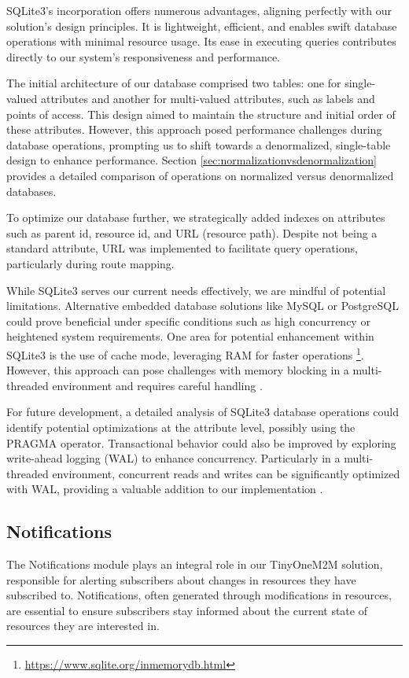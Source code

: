 \documentclass[a4paper,fleqn]{cas-dc}
\begin{document}
SQLite3's incorporation offers numerous advantages, aligning perfectly with our solution's design principles. It is lightweight, efficient, and enables swift database operations with minimal resource usage. Its ease in executing queries contributes directly to our system's responsiveness and performance.

The initial architecture of our database comprised two tables: one for single-valued attributes and another for multi-valued attributes, such as labels and points of access. This design aimed to maintain the structure and initial order of these attributes. However, this approach posed performance challenges during database operations, prompting us to shift towards a denormalized, single-table design to enhance performance. Section \ref{sec:normalizationvsdenormalization} provides a detailed comparison of operations on normalized versus denormalized databases.

To optimize our database further, we strategically added indexes on attributes such as parent id, resource id, and URL (resource path). Despite not being a standard attribute, URL was implemented to facilitate query operations, particularly during route mapping.

While SQLite3 serves our current needs effectively, we are mindful of potential limitations. Alternative embedded database solutions like MySQL or PostgreSQL could prove beneficial under specific conditions such as high concurrency or heightened system requirements. One area for potential enhancement within SQLite3 is the use of cache mode, leveraging RAM for faster operations \footnote{\url{https://www.sqlite.org/inmemorydb.html}}. However, this approach can pose challenges with memory blocking in a multi-threaded environment and requires careful handling \cite{}.

For future development, a detailed analysis of SQLite3 database operations could identify potential optimizations at the attribute level, possibly using the PRAGMA operator. Transactional behavior could also be improved by exploring write-ahead logging (WAL) to enhance concurrency. Particularly in a multi-threaded environment, concurrent reads and writes can be significantly optimized with WAL, providing a valuable addition to our implementation \cite{}.

\subsection{Notifications}

The Notifications module plays an integral role in our TinyOneM2M solution, responsible for alerting subscribers about changes in resources they have subscribed to. Notifications, often generated through modifications in resources, are essential to ensure subscribers stay informed about the current state of resources they are interested in.
\end{document}
